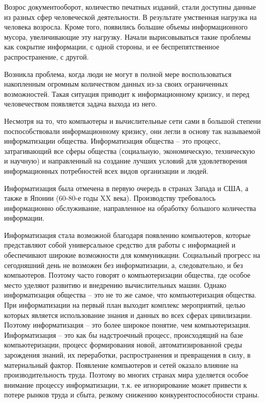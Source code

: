 Возрос документооборот, количество печатных изданий, стали доступны данные из разных сфер человеческой деятельности. В результате умственная нагрузка на человека возросла. Кроме того, появились большие объемы информационного мусора, увеличивающие эту нагрузку. Начали вырисовываться такие проблемы как сокрытие информации, с одной стороны, и ее беспрепятственное распространение, с другой.

Возникла проблема, когда люди не могут в полной мере воспользоваться накопленным огромным количеством данных из-за своих ограниченных возможностей. Такая ситуация приводит к информационному кризису, и перед человечеством появляется задача выхода из него.

Несмотря на то, что компьютеры и вычислительные сети сами в большой степени поспособствовали информационному кризису, они легли в основу так называемой информатизации общества. Информатизация общества – это процесс, затрагивающий все сферы общества (социальную, экономическую, техническую и научную) и направленный на создание лучших условий для удовлетворения информационных потребностей всех видов организации и людей.

Информатизация была отмечена в первую очередь в странах Запада и США, а также в Японии (60-80-е годы XX века). Производству требовалось информационно обслуживание, направленное на обработку большого количества информации.

Информатизация стала возможной благодаря появлению компьютеров, которые представляют собой универсальное средство для работы с информацией и обеспечивают широкие возможности для коммуникации. Социальный прогресс на сегодняшний день не возможен без информатизации, а, следовательно, и без компьютеров. Поэтому часто говорят о компьютеризации общества, где особое место уделяют развитию и внедрению вычислительных машин. Однако информатизация общества – это не то же самое, что компьютеризация общества. При информатизации на первый план выходит комплекс мероприятий, целью которых является использование знания и данных во всех сферах цивилизации. Поэтому информатизация – это более широкое понятие, чем компьютеризация. Информатизация – это как бы надстроечный процесс, происходящий на базе компьютеризации, процесс формирования новой, автоматизированной среды зарождения знаний, их переработки, распространения и превращения в силу, в материальный фактор.
Появление компьютеров и сетей оказало влияние на производительность труда. Поэтому во многих странах мира уделяется особое внимание процессу информатизации, т.к. ее игнорирование может привести к потере рынков труда и сбыта, резкому снижению конкурентоспособности страны.

